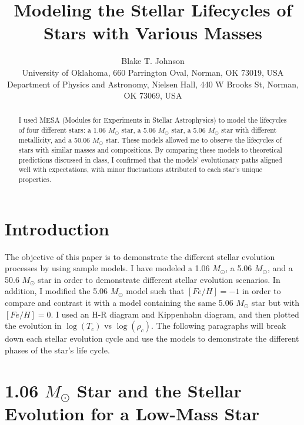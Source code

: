 \documentclass[fleqn,usenatbib]{mnras}
\title[Stellar Lifecycles of Various Masses]{Modeling the Stellar Lifecycles of Stars with Various Masses}
\author[Blake T. Johnson]{Blake T. Johnson\\
University of Oklahoma, 660 Parrington Oval, Norman, OK 73019, USA \\
Department of Physics and Astronomy, Nielsen Hall, 440 W Brooks St, Norman, OK 73069, USA
}
\begin{document}
\maketitle

\label{firstpage}
\pagerange{\pageref{firstpage}--\pageref{lastpage}}

\begin{abstract}
I used MESA (Modules for Experiments in Stellar Astrophysics) to model the lifecycles of four different stars: a 1.06 \(M_\odot\) star, a 5.06 \(M_\odot\) star, a 5.06 \(M_\odot\) star with different metallicity, and a 50.06 \(M_\odot\) star. These models allowed me to observe the lifecycles of stars with similar masses and compositions. By comparing these models to theoretical predictions discussed in class, I confirmed that the models' evolutionary paths aligned well with expectations, with minor fluctuations attributed to each star's unique properties.
\end{abstract}



\section{Introduction}

The objective of this paper is to demonstrate the different stellar evolution processes by using sample models. I have modeled a 1.06 \(M_\odot\), a 5.06 \(M_\odot\), and a 50.6 \(M_\odot\) star in order to demonstrate different stellar evolution scenarios. In addition, I modified the 5.06 \(M_\odot\) model such that $[Fe/H] = -1$ in order to compare and contrast it with a model containing the same 5.06 \(M_\odot\) star but with $[Fe/H] = 0$. I used an H-R diagram and Kippenhahn diagram, and then plotted the evolution in $\log(T_c)$ vs $\log(\rho_c)$. The following paragraphs will break down each stellar evolution cycle and use the models to demonstrate the different phases of the star's life cycle.


\section{1.06 \(M_\odot\) Star and the Stellar Evolution for a Low-Mass Star}
\end{document}
